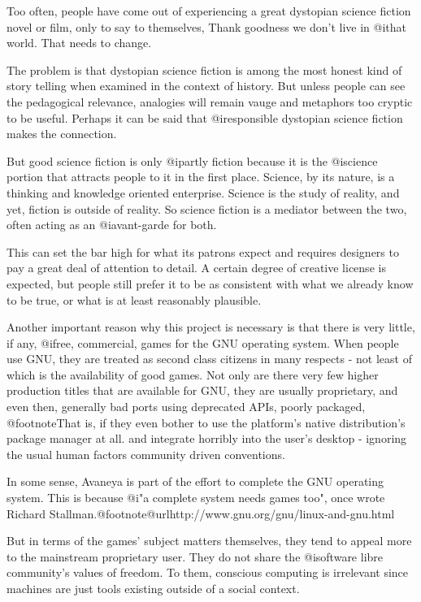 
Too often, people have come out of experiencing a great dystopian science fiction novel or film, only to say to themselves, Thank goodness we don't live in @i{that} world. That needs to change.

The problem is that dystopian science fiction is among the most honest kind of story telling when examined in the context of history. But unless people can see the pedagogical relevance, analogies will remain vauge and metaphors too cryptic to be useful. Perhaps it can be said that @i{responsible} dystopian science fiction makes the connection.

But good science fiction is only @i{partly} fiction because it is the @i{science} portion that attracts people to it in the first place. Science, by its nature, is a thinking and knowledge oriented enterprise. Science is the study of reality, and yet, fiction is outside of reality. So science fiction is a mediator between the two, often acting as an @i{avant-garde} for both.

This can set the bar high for what its patrons expect and requires designers to pay a great deal of attention to detail. A certain degree of creative license is expected, but people still prefer it to be as consistent with what we already know to be true, or what is at least reasonably plausible.

Another important reason why this project is necessary is that there is very little, if any, @i{free}, commercial, games for the GNU operating system. When people use GNU, they are treated as second class citizens in many respects - not least of which is the availability of good games. Not only are there very few higher production titles that are available for GNU, they are usually proprietary, and even then, generally bad ports using deprecated APIs, poorly packaged, @footnote{That is, if they even bother to use the platform's native distribution's package manager at all.} and integrate horribly into the user's desktop - ignoring the usual human factors community driven conventions.

In some sense, Avaneya is part of the effort to complete the GNU operating system. This is because @i{"a complete system needs games too"}, once wrote Richard Stallman.@footnote{@url{http://www.gnu.org/gnu/linux-and-gnu.html}}

But in terms of the games' subject matters themselves, they tend to appeal more to the mainstream proprietary user. They do not share the @i{software libre} community's values of freedom. To them, conscious computing is irrelevant since machines are just tools existing outside of a social context. 

